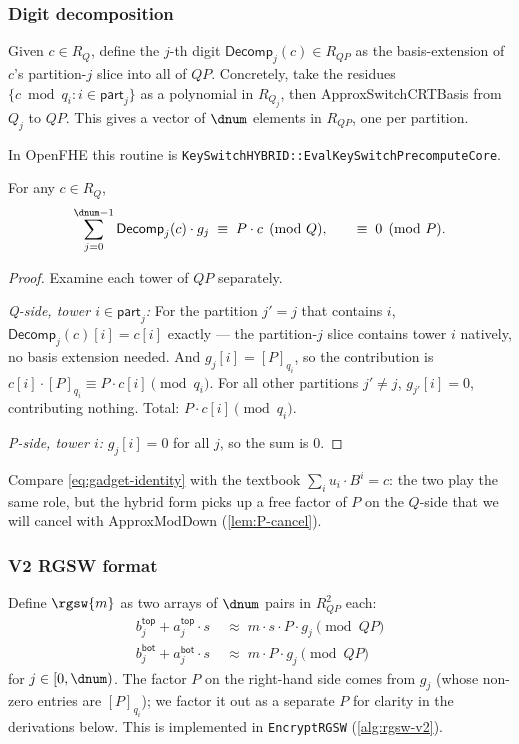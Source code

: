 \subsubsection{Digit decomposition}

Given $c \in R_Q$, define the $j$-th digit $\mathsf{Decomp}_j(c) \in R_{QP}$ as the basis-extension of $c$'s partition-$j$ slice into all of $QP$. Concretely, take the residues $\{ c \bmod q_i : i \in \mathsf{part}_j \}$ as a polynomial in $R_{Q_j}$, then \textsf{ApproxSwitchCRTBasis} from $Q_j$ to $QP$. This gives a vector of $\dnum$ elements in $R_{QP}$, one per partition.

In OpenFHE this routine is \texttt{KeySwitchHYBRID::EvalKeySwitchPrecomputeCore}.

\begin{lemma}
\label{lem:gadget-identity}
For any $c \in R_Q$,
\begin{equation}
    \label{eq:gadget-identity}
    \sum_{j=0}^{\dnum-1} \mathsf{Decomp}_j(c) \cdot g_j \;\equiv\; P \cdot c \pmod{Q},
    \qquad \equiv\; 0 \pmod{P}.
\end{equation}
\end{lemma}

\begin{proof}
Examine each tower of $QP$ separately.

\noindent\emph{Q-side, tower $i \in \mathsf{part}_j$:} For the partition $j' = j$ that contains $i$, $\mathsf{Decomp}_j(c)[i] = c[i]$ exactly --- the partition-$j$ slice contains tower $i$ natively, no basis extension needed. And $g_j[i] = [P]_{q_i}$, so the contribution is $c[i] \cdot [P]_{q_i} \equiv P \cdot c[i] \pmod{q_i}$. For all other partitions $j' \neq j$, $g_{j'}[i] = 0$, contributing nothing. Total: $P \cdot c[i] \pmod{q_i}$.

\noindent\emph{P-side, tower $i$:} $g_j[i] = 0$ for all $j$, so the sum is $0$.
\end{proof}

Compare \eqref{eq:gadget-identity} with the textbook $\sum_i u_i \cdot B^i = c$: the two play the same role, but the hybrid form picks up a free factor of $P$ on the $Q$-side that we will cancel with \textsf{ApproxModDown} (\autoref{lem:P-cancel}).

\subsubsection{V2 RGSW format}
\label{sec:rgsw:v2-format}

Define $\rgsw{m}$ as two arrays of $\dnum$ pairs in $R_{QP}^2$ each:
\begin{align}
    \label{eq:rgsw-v2-top}
    b_j^{\mathsf{top}} + a_j^{\mathsf{top}} \cdot s &\;\approx\; m \cdot s \cdot P \cdot g_j \pmod{QP} \\
    \label{eq:rgsw-v2-bot}
    b_j^{\mathsf{bot}} + a_j^{\mathsf{bot}} \cdot s &\;\approx\; m \cdot P \cdot g_j \pmod{QP}
\end{align}
for $j \in [0, \dnum)$. The factor $P$ on the right-hand side comes from $g_j$ (whose non-zero entries are $[P]_{q_i}$); we factor it out as a separate $P$ for clarity in the derivations below. This is implemented in \texttt{EncryptRGSW} (\autoref{alg:rgsw-v2}).

